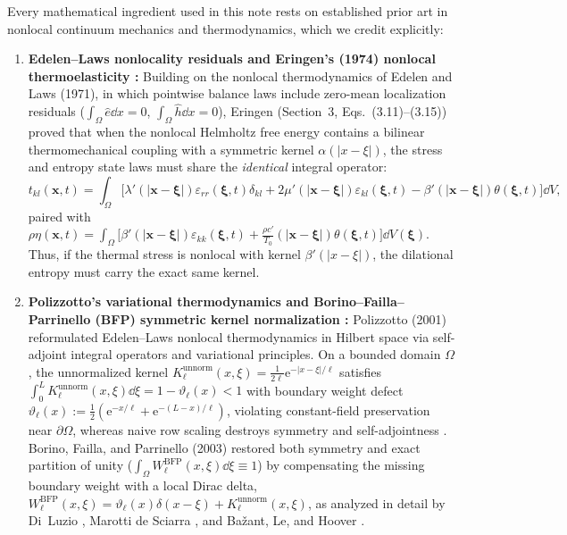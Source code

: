 Every mathematical ingredient used in this note rests on established prior art in nonlocal continuum mechanics and thermodynamics, which we credit explicitly:

\begin{enumerate}[leftmargin=*,align=left]
  \item \textbf{Edelen--Laws nonlocality residuals and Eringen's (1974) nonlocal thermoelasticity \cite{Eringen1972Linear,Eringen1974,Eringen2002}:} Building on the nonlocal thermodynamics of Edelen and Laws (1971), in which pointwise balance laws include zero-mean localization residuals ($\int_\Omega \hat{e}\dd x = 0$, $\int_\Omega \hat{h}\dd x = 0$), Eringen \cite{Eringen1974} (Section~3, Eqs.~(3.11)--(3.15)) proved that when the nonlocal Helmholtz free energy contains a bilinear thermomechanical coupling with a symmetric kernel $\alpha(|x-\xi|)$, the stress and entropy state laws must share the \emph{identical} integral operator:
  \begin{equation}\label{eq:eringen_1974_laws}
    t_{kl}(\bm{x},t) = \int_\Omega \Big[\lambda'(\lvert\bm{x}-\bm{\xi}\rvert)\varepsilon_{rr}(\bm{\xi},t)\delta_{kl} + 2\mu'(\lvert\bm{x}-\bm{\xi}\rvert)\varepsilon_{kl}(\bm{\xi},t) - \beta'(\lvert\bm{x}-\bm{\xi}\rvert)\theta(\bm{\xi},t)\Big]\dd V,
  \end{equation}
  paired with $\rho\eta(\bm{x},t) = \int_\Omega \big[\beta'(\lvert\bm{x}-\bm{\xi}\rvert)\varepsilon_{kk}(\bm{\xi},t) + \frac{\rho c'}{T_0}(\lvert\bm{x}-\bm{\xi}\rvert)\theta(\bm{\xi},t)\big]\dd V(\bm{\xi})$. Thus, if the thermal stress is nonlocal with kernel $\beta'(|x-\xi|)$, the dilational entropy must carry the exact same kernel.

  \item \textbf{Polizzotto's variational thermodynamics and Borino--Failla--Parrinello (BFP) symmetric kernel normalization \cite{BazantJirasek2002,DiLuzio2005,MarottiDeSciarra2009,BazantLeHoover2010}:} Polizzotto (2001) reformulated Edelen--Laws nonlocal thermodynamics in Hilbert space via self-adjoint integral operators and variational principles. On a bounded domain $\Omega$, the unnormalized kernel $K_\ell^{\mathrm{unnorm}}(x,\xi) = \frac{1}{2\ell}\mathrm{e}^{-|x-\xi|/\ell}$ satisfies $\int_0^L K_\ell^{\mathrm{unnorm}}(x,\xi)\dd\xi = 1 - \vartheta_\ell(x) < 1$ with boundary weight defect $\vartheta_\ell(x) := \frac{1}{2}(\mathrm{e}^{-x/\ell} + \mathrm{e}^{-(L-x)/\ell})$, violating constant-field preservation near $\partial\Omega$, whereas naive row scaling destroys symmetry and self-adjointness \cite{BazantJirasek2002,DiLuzio2005}. Borino, Failla, and Parrinello (2003) restored both symmetry and exact partition of unity ($\int_\Omega W_\ell^{\mathrm{BFP}}(x,\xi)\dd\xi \equiv 1$) by compensating the missing boundary weight with a local Dirac delta, $W_\ell^{\mathrm{BFP}}(x,\xi) = \vartheta_\ell(x)\delta(x-\xi) + K_\ell^{\mathrm{unnorm}}(x,\xi)$, as analyzed in detail by Di~Luzio \cite{DiLuzio2005}, Marotti de Sciarra \cite{MarottiDeSciarra2009}, and Ba{\v z}ant, Le, and Hoover \cite{BazantLeHoover2010}.


\end{enumerate}
